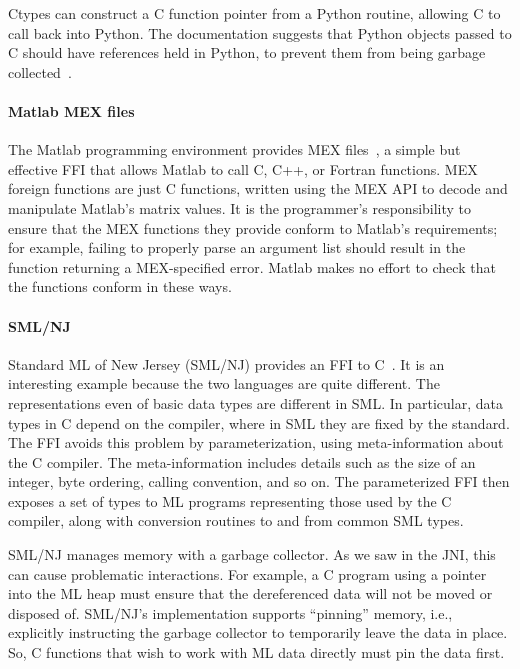 Ctypes can construct a C function pointer from a Python routine,
allowing C to call back into Python. The documentation suggests
that Python objects passed to C should have references held in
Python, to prevent them from being garbage
collected~\cite{pythonctypes}.

\paragraph{Matlab MEX files}

The Matlab programming environment provides MEX
files~\cite{mathworksmexfiles}, a simple but effective FFI that
allows Matlab to call C, C++, or Fortran functions. MEX foreign
functions are just C functions, written using the MEX API to
decode and manipulate Matlab's matrix values. It is the
programmer's responsibility to ensure that the MEX functions they
provide conform to Matlab's requirements; for example, failing to
properly parse an argument list should result in the function
returning a MEX-specified error. Matlab makes no effort to check
that the functions conform in these ways.

\paragraph{SML/NJ}

Standard ML of New Jersey (SML/NJ) provides an FFI to C~\cite{huelsbergen96mlffi}. It is an interesting example because the two languages are quite different. The representations even of basic data types are different in SML. In particular, data types in C depend on the compiler, where in SML they are fixed by the standard. The FFI avoids this problem by parameterization, using meta-information about the C compiler. The meta-information includes details such as the size of an integer, byte ordering, calling convention, and so on. The parameterized FFI then exposes a set of types to ML programs representing those used by the C compiler, along with conversion routines to and from common SML types.

SML/NJ manages memory with a garbage collector. As we saw in the JNI, this can cause problematic interactions. For example, a C program using a pointer into the ML heap must ensure that the dereferenced data will not be moved or disposed of. SML/NJ's implementation supports ``pinning'' memory, i.e., explicitly instructing the garbage collector to temporarily leave the data in place. So, C functions that wish to work with ML data directly must pin the data first.

